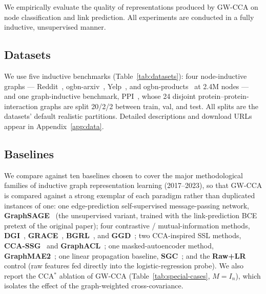 \documentclass{article}
\begin{document}
We empirically evaluate the quality of representations produced by GW-CCA on
node classification and link prediction. All experiments are conducted in a
fully inductive, unsupervised manner.

\subsection{Datasets}
We use five inductive benchmarks (Table~\ref{tab:datasets}): four
node-inductive graphs --- Reddit~\citep{hamilton2017inductive},
ogbn-arxiv~\citep{hu2020open}, Yelp~\citep{zeng2019graphsaint}, and
ogbn-products~\citep{hu2020open} at 2.4M nodes --- and one graph-inductive
benchmark, PPI~\citep{hamilton2017inductive}, whose 24 disjoint
protein--protein-interaction graphs are split 20/2/2 between train, val, and
test. All splits are the datasets' default realistic partitions. Detailed
descriptions and download URLs appear in Appendix~\ref{app:data}.

\subsection{Baselines}
\label{sec:exp:baselines}
We compare against ten baselines chosen to cover the major methodological
families of inductive graph representation learning (2017--2023), so that
GW-CCA is compared against a strong exemplar of each paradigm rather than
duplicated instances of one:
one edge-prediction self-supervised message-passing network,
\textbf{GraphSAGE}~\citep{hamilton2017inductive} (the unsupervised variant,
trained with the link-prediction BCE pretext of the original paper);
four contrastive / mutual-information methods,
\textbf{DGI}~\citep{velickovic2019deep},
\textbf{GRACE}~\citep{zhu2020deep},
\textbf{BGRL}~\citep{thakoor2022bgrl}, and
\textbf{GGD}~\citep{zheng2022ggd};
two CCA-inspired SSL methods, \textbf{CCA-SSG}~\citep{zhang2021ccassg} and
\textbf{GraphACL}~\citep{xiao2023graphacl};
one masked-autoencoder method, \textbf{GraphMAE2}~\citep{hou2023graphmae2};
one linear propagation baseline, \textbf{SGC}~\citep{wu2019simplifying};
and the \textbf{Raw+LR} control (raw features fed directly into the
logistic-regression probe). We also report the CCA$^\ast$ ablation of
GW-CCA (Table~\ref{tab:special-cases}, $M = I_n$), which isolates the effect
of the graph-weighted cross-covariance.
\end{document}
